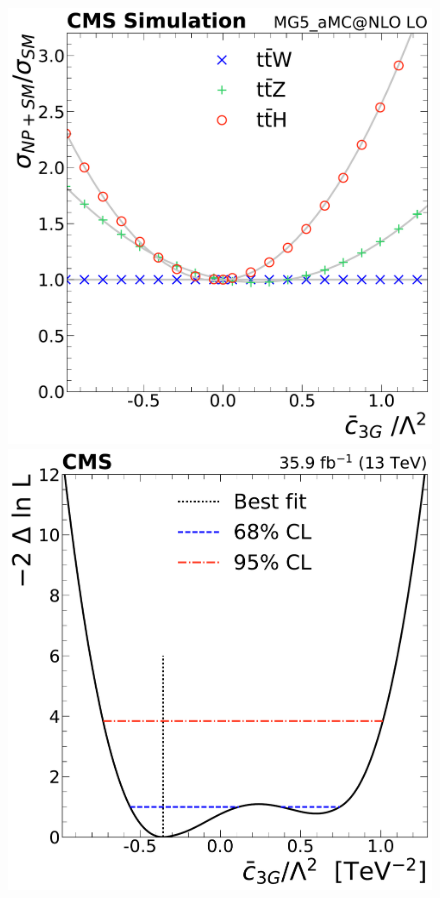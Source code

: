 \begin{landscape}
\begin{figure}
{        \includegraphics[height=\textheight]{figures/thirteen-TeV/NP/mu/c3G}\hspace{1cm}
        \includegraphics[height=\textheight]{figures/thirteen-TeV/NP/nll/c3G}\hspace{1cm}
}
\end{figure}
\end{landscape}
